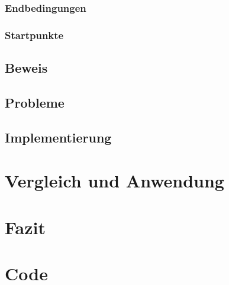 \documentclass[12pt]{article}
\begin{document}
    \subsubsection{Endbedingungen}
    \subsubsection{Startpunkte}
    \subsection{Beweis}
    \subsection{Probleme}
    \subsection{Implementierung}

\section{Vergleich und Anwendung}

\section{Fazit}

\section{Code}
\end{document}
